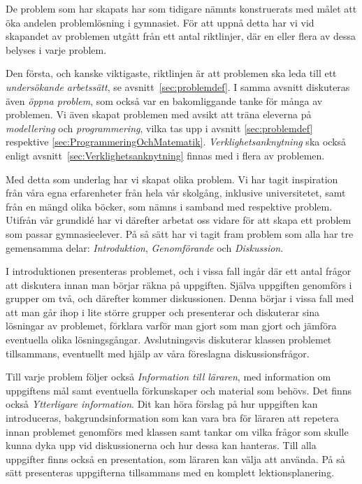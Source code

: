 
    \textcolor{lila}{De problem som har skapats har som tidigare nämnts konstruerats med målet att öka andelen problemlösning i gymnasiet. För att uppnå detta har vi vid skapandet av problemen utgått från ett antal riktlinjer, där en eller flera av dessa belyses i varje problem.}
    
    \textcolor{lila}{Den första, och kanske viktigaste, riktlinjen är att problemen ska leda till ett \textsl{undersökande arbetssätt}, se avsnitt~\ref{sec:problemdef}. I samma avsnitt diskuteras även \textsl{öppna problem}, som också var en bakomliggande tanke för många av problemen. Vi även skapat problemen med avsikt att träna eleverna på \textsl{modellering} och \textsl{programmering}, vilka tas upp i avsnitt \ref{sec:problemdef} respektive \ref{sec:ProgrammeringOchMatematik}. \textsl{Verklighetsanknytning} ska också enligt avsnitt~\ref{sec:Verklighetsanknytning} finnas med i flera av problemen.}
    
    \textcolor{lila}{Med detta som underlag har vi skapat olika problem. Vi har tagit inspiration från våra egna erfarenheter från hela vår skolgång, inklusive universitetet, samt från en mängd olika böcker, som nämns i samband med respektive problem. Utifrån vår grundidé har vi därefter arbetat oss vidare för att skapa ett problem som passar gymnasieelever. På så sätt har vi tagit fram problem som alla har tre gemensamma delar: \textsl{Introduktion}, \textsl{Genomförande} och \textsl{Diskussion}.}
    
    \textcolor{lila}{I introduktionen presenteras problemet, och i vissa fall ingår där ett antal frågor att diskutera innan man börjar räkna på uppgiften. Själva uppgiften genomförs i grupper om två, och därefter kommer diskussionen. Denna börjar i vissa fall med att man går ihop i lite större grupper och presenterar och diskuterar sina lösningar av problemet, förklara varför man gjort som man gjort och jämföra eventuella olika lösningsgångar. Avslutningsvis diskuterar klassen problemet tillsammans, eventuellt med hjälp av våra föreslagna diskussionsfrågor.} 
    
    \textcolor{lila}{Till varje problem följer också \textsl{Information till läraren}, med information om uppgiftens mål samt eventuella förkunskaper och material som behövs. Det finns också \textsl{Ytterligare information}. Dit kan höra förslag på hur uppgiften kan introduceras, bakgrundsinformation som kan vara bra för läraren att repetera innan problemet genomförs med klassen samt tankar om vilka frågor som skulle kunna dyka upp vid diskussionerna och hur dessa kan hanteras. Till alla uppgifter finns också en presentation, som läraren kan välja att använda. På så sätt presenteras uppgifterna tillsammans med en komplett lektionsplanering.}
    
